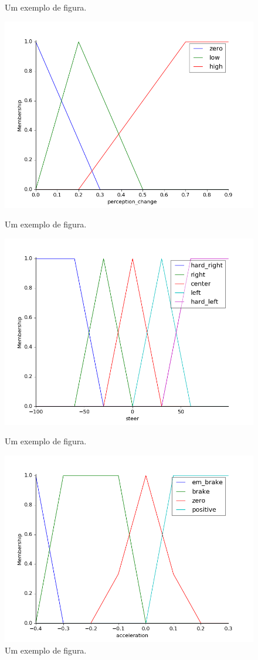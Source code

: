 \documentclass[twoside,conference,a4paper]{IEEEtran}
\begin{document}
\begin{figure}[]
  \caption{Um exemplo de figura.}
  \label{fig:fig2}
  \includegraphics[width=1\hsize]{figuras/per_change.png}
  \caption{Um exemplo de figura.}
  \label{fig:fig3}

  \includegraphics[width=1\hsize]{figuras/steer.png}
  \caption{Um exemplo de figura.}
  \label{fig:fig4}

  \includegraphics[width=1\hsize]{figuras/acc.png}
  \caption{Um exemplo de figura.}
  \label{fig:fig5}
\end{figure}
\end{document}
